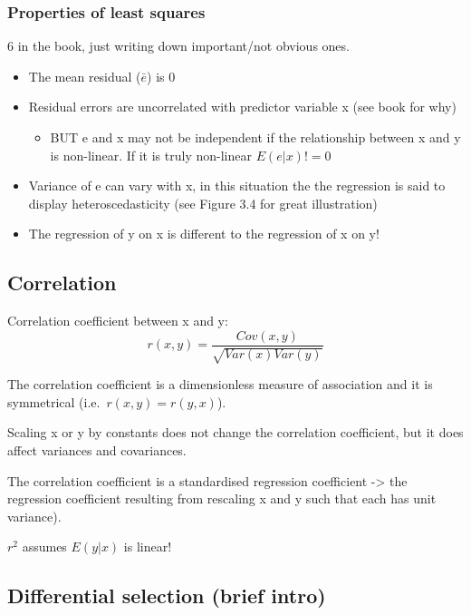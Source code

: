 \documentclass[
]{article}
\providecommand{\tightlist}{%
  \setlength{\itemsep}{0pt}\setlength{\parskip}{0pt}}
\begin{document}
\hypertarget{properties-of-least-squares}{%
\subsubsection{Properties of least
squares}\label{properties-of-least-squares}}

6 in the book, just writing down important/not obvious ones.

\begin{itemize}
\tightlist
\item
  The mean residual (\(\bar{e}\)) is 0
\item
  Residual errors are uncorrelated with predictor variable x (see book
  for why)

  \begin{itemize}
  \tightlist
  \item
    BUT e and x may not be independent if the relationship between x and
    y is non-linear. If it is truly non-linear \(E(e|x) != 0\)
  \end{itemize}
\item
  Variance of e can vary with x, in this situation the the regression is
  said to display heteroscedasticity (see Figure 3.4 for great
  illustration)
\item
  The regression of y on x is different to the regression of x on y!
\end{itemize}

\hypertarget{correlation}{%
\subsection{Correlation}\label{correlation}}

Correlation coefficient between x and y:
\[r(x, y) = \frac{Cov(x, y)} {\sqrt{Var(x) Var(y)}}\]

The correlation coefficient is a dimensionless measure of association
and it is symmetrical (i.e.~\(r(x, y) = r(y, x)\)).

Scaling x or y by constants does not change the correlation coefficient,
but it does affect variances and covariances.

The correlation coefficient is a standardised regression coefficient
-\textgreater{} the regression coefficient resulting from rescaling x
and y such that each has unit variance).

\(r^2\) assumes \(E(y|x)\) is linear!

\hypertarget{differential-selection-brief-intro}{%
\subsection{Differential selection (brief
intro)}\label{differential-selection-brief-intro}}
\end{document}
